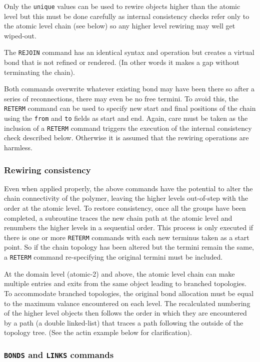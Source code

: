 Only the {\tt unique} values can be used to rewire objects higher than the atomic level but this
must be done carefully as internal consistency checks refer only to the atomic level chain (see below)
so any higher level rewiring may well get wiped-out.

The {\tt REJOIN} command has an identical syntax and operation but creates a virtual bond that is
not refined or rendered. (In other words it makes a gap without terminating the chain).

Both commands overwrite whatever existing bond may have been there so after a series of reconnections,
there may even be no free termini.  To avoid this, the {\tt RETERM} command can be used to specify new
start and final positions of the chain using the {\tt from} and {\tt to} fields as start and end.
Again, care must be taken as the inclusion of a {\tt RETERM}
command triggers the execution of the internal consistency check described below.  Otherwise it
is assumed that the rewiring operations are harmless. 

\subsubsection{Rewiring consistency}

Even when applied properly, the above commands have the potential to alter the chain connectivity
of the polymer, leaving the higher levels out-of-step with the order at the atomic level.
To restore consistency, once all the groups have been completed, a subroutine traces the new
chain path at the atomic level and renumbers the higher levels in a sequential order.
This process is only executed if there is one or more {\tt RETERM} commands with each new
terminus taken as a start point.  So if the chain topology has been altered but the termini
remain the same, a {\tt RETERM} command re-specifying the original termini must be included.

At the domain level (atomic-2) and above, the atomic level chain can make multiple
entries and exits from the same object leading to branched topologies.
To accommodate branched topologies, the original bond allocation must be equal to the maximum
valance encountered on each level.   The recalculated numbering of the higher level objects then 
follows the order in which they are encountered by a path (a double linked-list) that traces a 
path following the outside of the topology tree.  (See the actin example below for clarification). 

\subsubsection{{\tt BONDS} and {\tt LINKS} commands}

